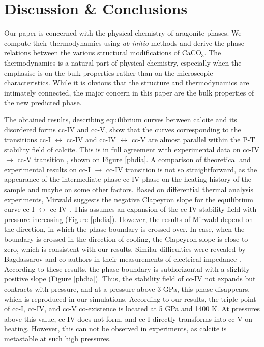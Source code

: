 \documentclass[journal=jacsat,manuscript=article]{achemso}
\begin{document}
			\section{Discussion \& Conclusions}
Our paper is concerned with the physical chemistry of aragonite phases. We compute their thermodynamics using {\it ab initio} methods and
derive the phase relations between the various structural modifications of CaCO$_3$. The thermodynamics is a natural part
of physical chemistry, especially when the emphasise is on the bulk properties rather than on the microscopic characteristics.
While it is obvious that the structure and thermodynamics are intimately connected, the major concern in this paper are the bulk properties of the new predicted phase.


The obtained results, describing equilibrium curves between calcite and its disordered forms cc-IV and cc-V, show that the curves corresponding to the transitions cc-I $\leftrightarrow$ cc-IV and cc-IV $\leftrightarrow$ cc-V are almost parallel within the P-T stability field of calcite. 
This is in full agreement with experimental data on cc-IV $\to$ cc-V transition \cite{bagdassarov2003, redfern1989, mirwald1976}, shown on Figure \ref{phdia}. 
A comparison of theoretical and experimental results on cc-I $\to$ cc-IV transition is not so straightforward, as the appearance of the intermediate phase cc-IV phase on the heating history of the sample and maybe on some other factors.
Based on differential thermal analysis experiments, Mirwald suggests the negative Clapeyron slope for the equilibrium curve cc-I $\leftrightarrow$ cc-IV  \cite{mirwald1976}. 
This assumes an expansion of the cc-IV stability field with pressure increasing (Figure \ref{phdia}).
However, the results of Mirwald depend on the direction, in which the phase boundary is crossed over.
In case, when the boundary is crossed in the direction of cooling, the Clapeyron slope is close to zero, which is consistent with our results. 
Similar difficulties were revealed by Bagdassarov and co-authors in their measurements of electrical impedance  \cite{bagdassarov2003}.
According to these results, the phase boundary is subhorizontal with a slightly positive slope (Figure \ref{phdia}). 
Thus, the stability field of cc-IV not expands but contracts with pressure, and at a pressure above 3 GPa, this phase disappears, which is reproduced in our simulations. 
According to our results, the triple point of cc-I, cc-IV, and cc-V co-existence is located at 5 GPa and 1400 K.
At pressures above this value, cc-IV does not form, and cc-I directly transforms into cc-V on heating.
However, this can not be observed in experiments, as calcite is metastable at such high pressures.
\end{document}
